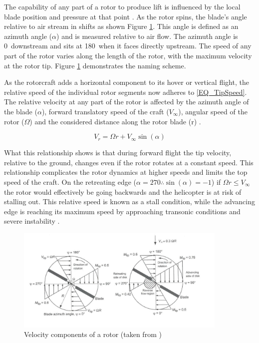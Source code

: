 \documentclass[a4paper, 10pt, conference]{ieeeconf}
\begin{document}
The capability of any part of a rotor to produce lift is influenced by the local blade position and pressure at that point \cite{Leishman}. As the rotor spins, the blade's angle relative to air stream in shifts as shown Figure \ref{IM_TipSpeed}. This angle is defined as an azimuth angle ($\alpha$) and is measured relative to air flow. The azimuth angle is 0\textdegree\ downstream and sits at 180\textdegree\ when it faces directly upstream. The speed of any part of the rotor varies along the length of the rotor, with the maximum velocity at the rotor tip. Figure \ref{IM_TipSpeed} demonstrates the naming scheme.

As the rotorcraft adds a horizontal component to its hover or vertical flight, the relative speed of the individual rotor segments now adheres to \eqref{EQ_TipSpeed}. The relative velocity at any part of the rotor is affected by the azimuth angle of the blade ($\alpha$), forward translatory speed of the craft ($V_{\infty}$), angular speed of the rotor ($\Omega$) and the considered distance along the rotor blade (r) \cite{Leishman, RotorCraftHand}.

\begin{equation}
\label{EQ_TipSpeed}
V_{r} = \Omega r + V_{\infty}\sin(\alpha)
\end{equation}

What this relationship shows is that during forward flight the tip velocity, relative to the ground, changes even if the rotor rotates at a constant speed. This relationship complicates the rotor dynamics at higher speeds and limits the top speed of the craft. On the retreating edge ($\alpha = 270$\textdegree $\therefore \sin(\alpha) = -1$) if $\Omega r \leq V_{\infty}$ the rotor would effectively be going backwards and the helicopter is at risk of stalling out. This relative speed is known as a stall condition, while the advancing edge is reaching its maximum speed by approaching transonic conditions and severe instability \cite{Leishman, RotorCraftHand}.

\begin{figure}[t]
\centering
\includegraphics[height = 5cm]{Images/Literature/TipSpeed}
\caption{Velocity components of a rotor (taken from \cite{Leishman})}
\label{IM_TipSpeed}
\end{figure}
\end{document}
